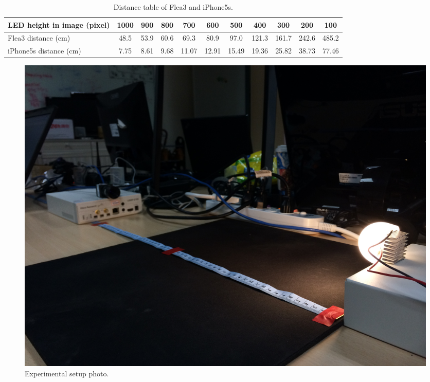 \begin{table}[!htb]
\centering
\caption{Distance table of Flea3 and iPhone5s.}
  \hspace{-2em}
  \tabcolsep=0.11cm
  \begin{tabular}{lcccccccccc}
  \hline LED height in image (pixel) & 1000 & 900 & 800 & 700 & 600 & 500 & 400 & 300 & 200 & 100 \\
  \hline 
  \hline Flea3 distance (cm) & 48.5 & 53.9 &60.6& 69.3 &80.9& 97.0& 121.3 &161.7 &242.6 &485.2\\
  \hline iPhone5s distance (cm) & 7.75& 8.61& 9.68& 11.07& 12.91& 15.49& 19.36& 25.82& 38.73& 77.46 \\
  \end{tabular}
  \label{tab:comp_dis} 
\end{table}

\begin{figure}[!htb]
  \centering
  \includegraphics[scale=0.075]{fig/exp4_setup.JPG}
  \caption{Experimental setup photo.}
  \label{fig:exp4_setup}
\end{figure}

